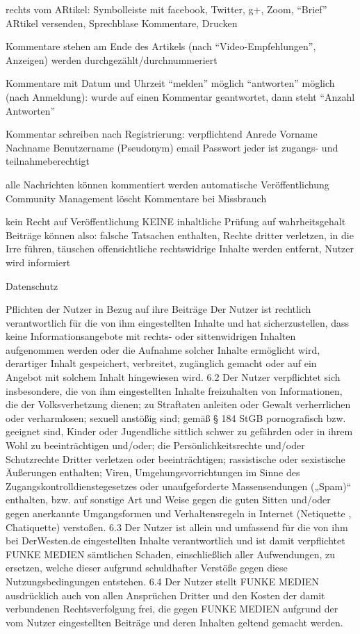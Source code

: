 rechts vom ARtikel: Symbolleiste mit facebook, Twitter, g+, Zoom, ``Brief'' ARtikel versenden, Sprechblase Kommentare, Drucken

Kommentare stehen am Ende des Artikels (nach ``Video-Empfehlungen'', Anzeigen)
werden durchgezählt/durchnummeriert



Kommentare mit Datum und Uhrzeit
``melden'' möglich
``antworten'' möglich (nach Anmeldung): wurde auf einen Kommentar geantwortet, dann steht ``Anzahl Antworten''

Kommentar schreiben nach Registrierung:
	verpflichtend
	Anrede
	Vorname
	Nachname
	Benutzername (Pseudonym)
	email
	Passwort
	jeder ist zugangs- und teilnahmeberechtigt
	

alle Nachrichten können kommentiert werden 
automatische Veröffentlichung
Community Management löscht Kommentare bei Missbrauch

kein Recht auf Veröffentlichung
KEINE inhaltliche Prüfung auf wahrheitsgehalt
Beiträge können also: falsche Tatsachen enthalten, Rechte dritter verletzen, in die Irre führen, täuschen 
offensichtliche rechtswidrige Inhalte werden entfernt, Nutzer wird informiert

Datenschutz

Pflichten der Nutzer in Bezug auf ihre Beiträge
Der Nutzer ist rechtlich verantwortlich für die von ihm eingestellten Inhalte und hat sicherzustellen, dass keine Informationsangebote mit rechts- oder sittenwidrigen Inhalten aufgenommen werden oder die Aufnahme solcher Inhalte ermöglicht wird, derartiger Inhalt gespeichert, verbreitet, zugänglich gemacht oder auf ein Angebot mit solchem Inhalt hingewiesen wird.
6.2 Der Nutzer verpflichtet sich insbesondere, die von ihm eingestellten Inhalte freizuhalten von Informationen, die der Volksverhetzung dienen; zu Straftaten anleiten oder Gewalt verherrlichen oder verharmlosen; sexuell anstößig sind; gemäß § 184 StGB pornografisch bzw. geeignet sind, Kinder oder Jugendliche sittlich schwer zu gefährden oder in ihrem Wohl zu beeinträchtigen und/oder; die Persönlichkeitsrechte und/oder Schutzrechte Dritter verletzen oder beeinträchtigen; rassistische oder sexistische Äußerungen enthalten; Viren, Umgehungsvorrichtungen im Sinne des Zugangskontrolldienstegesetzes oder unaufgeforderte Massensendungen („Spam)“ enthalten, bzw. auf sonstige Art und Weise gegen die guten Sitten und/oder gegen anerkannte Umgangsformen und Verhaltensregeln in Internet (Netiquette , Chatiquette) verstoßen.
6.3 Der Nutzer  ist allein und umfassend für die von ihm bei DerWesten.de eingestellten Inhalte verantwortlich und ist damit verpflichtet FUNKE MEDIEN sämtlichen Schaden, einschließlich aller Aufwendungen, zu ersetzen, welche dieser aufgrund schuldhafter Verstöße gegen diese Nutzungsbedingungen entstehen.
6.4 Der Nutzer stellt FUNKE MEDIEN ausdrücklich auch von allen Ansprüchen Dritter und den Kosten der damit verbundenen Rechtsverfolgung frei, die gegen FUNKE MEDIEN aufgrund der vom Nutzer eingestellten Beiträge und deren Inhalten geltend gemacht werden.

